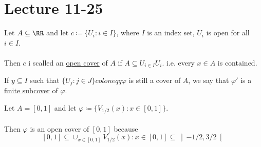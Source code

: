 \documentclass[class=scrartcl, crop=false]{standalone}
\date{2019-11-25}
\begin{document}
\section{Lecture 11-25}

\begin{definition}
  Let $A \subseteq \RR$ and let $c \coloneqq \{U_i : i \in I\}$, where $I$ is an index set, $U_i$ is open for all $i \in I$.
  \\\\
  Then $c$ i scalled an \ul{open cover} of $A$ if $A \subseteq U_{i \in I}U_i$. i.e. every $x \in A$ is contained.
\end{definition} 

If $y \subseteq I$ such that $\{U_j : j \in J\} coloneqq \varphi$  is still a cover of $A$, we say that $\varphi'$ is a \ul{finite subcover} of $\varphi$.
\begin{example}
  Let $A = [0, 1]$ and let $\varphi \coloneqq \{V_{1 / 2}(x) : x \in [0, 1]\}$.
  \\\\
  Then $\varphi$ is an open cover of $[0, 1]$ because 
  \[
    [0, 1] \subseteq \cup_{x \in [0, 1]}V_{1 / 2}(x) : x \in [0, 1] \subseteq \left]-1 / 2, 3 / 2\right[
  \]
\end{example} 
\end{document}
